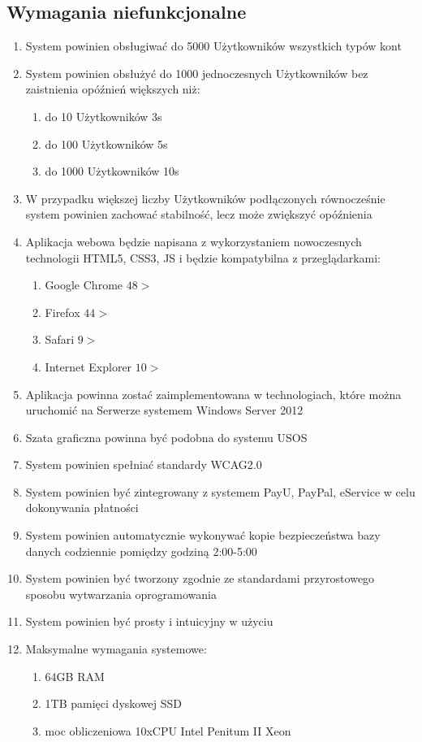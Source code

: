 \documentclass{article}
\begin{document}
\subsection{Wymagania niefunkcjonalne}
\begin{enumerate}
	\item System powinien obsługiwać do 5000 Użytkowników wszystkich typów kont
	\item System powinien obsłużyć do 1000 jednoczesnych Użytkowników bez zaistnienia opóźnień większych niż:
	\begin{enumerate}
		\item 	do 10 Użytkowników 3s
		\item do 100 Użytkowników 5s
		\item do 1000 Użytkowników 10s
	\end{enumerate}
	\item W przypadku większej liczby Użytkowników podłączonych równocześnie system powinien zachować stabilność, lecz może zwiększyć opóźnienia
	\item Aplikacja webowa będzie napisana z wykorzystaniem nowoczesnych technologii HTML5, CSS3, JS i będzie kompatybilna z przeglądarkami:
	\begin{enumerate}
		\item Google Chrome $48>$
		\item Firefox $44>$
		\item Safari $9>$
		\item Internet Explorer $10>$
	\end{enumerate}
	\item Aplikacja powinna zostać zaimplementowana w technologiach, które można uruchomić na Serwerze systemem Windows Server 2012
	\item Szata graficzna powinna być podobna do systemu USOS
	\item System powinien spełniać standardy WCAG2.0
	\item System powinien być zintegrowany z systemem PayU, PayPal, eService w celu dokonywania płatności
	\item System powinien automatycznie wykonywać kopie bezpieczeństwa bazy danych codziennie pomiędzy godziną 2:00-5:00
	\item System powinien być tworzony zgodnie ze standardami przyrostowego sposobu  wytwarzania oprogramowania
	\item System powinien być prosty i intuicyjny w użyciu
	\item Maksymalne wymagania systemowe:
	\begin{enumerate}
		\item 64GB RAM
		\item 1TB pamięci dyskowej SSD
		\item moc obliczeniowa 10xCPU Intel Penitum II Xeon
	\end{enumerate}


\end{enumerate}
\end{document}
